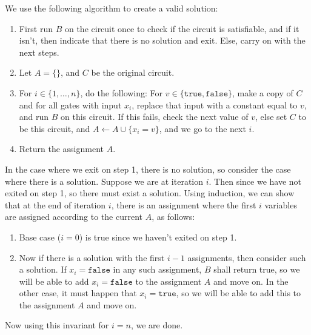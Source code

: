 \begin{soln}
    We use the following algorithm to create a valid solution:
    \begin{enumerate}
        \item First run $B$ on the circuit once to check if the circuit is satisfiable, and if it isn't, then indicate that there is no solution and exit. Else, carry on with the next steps.
        \item Let $A = \{\}$, and $C$ be the original circuit.
        \item For $i \in \{1, \ldots, n\}$, do the following: For $v \in \{\texttt{true}, \texttt{false}\}$, make a copy of $C$ and for all gates with input $x_i$, replace that input with a
            constant equal to $v$, and run $B$ on this circuit. If this fails, check the next value of $v$, else set $C$ to be this circuit, and $A \gets A \cup \{x_i = v\}$, and we go to the next
            $i$.
        \item Return the assignment $A$.
    \end{enumerate}
    In the case where we exit on step 1, there is no solution, so consider the case where there is a solution. Suppose we are at iteration $i$. Then since we have not exited on step 1, so there must exist a solution. Using induction, we can show that at the end of iteration $i$, there is an
        assignment where the first $i$ variables are assigned according to the current $A$, as follows:
        \begin{enumerate}
            \item Base case ($i = 0$) is true since we haven't exited on step 1.
            \item Now if there is a solution with the first $i - 1$ assignments, then consider such a solution. If $x_i = \texttt{false}$ in any such assignment, $B$ shall return true, so we will be
                able to add $x_i = \texttt{false}$ to the assignment $A$ and move on. In the other case, it must happen that $x_i = \texttt{true}$, so we will be able to add this to the
                assignment $A$ and move on.
        \end{enumerate}
    Now using this invariant for $i = n$, we are done.
\end{soln}
